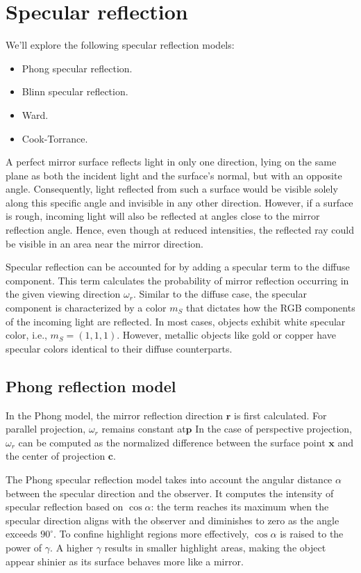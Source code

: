 \section{Specular reflection}

We'll explore the following specular reflection models:
\begin{itemize}
    \item Phong specular reflection.
    \item Blinn specular reflection.
    \item Ward.
    \item Cook-Torrance.
\end{itemize}
A perfect mirror surface reflects light in only one direction, lying on the same plane as both the incident light and the surface's normal, but with an opposite angle. 
Consequently, light reflected from such a surface would be visible solely along this specific angle and invisible in any other direction. 
However, if a surface is rough, incoming light will also be reflected at angles close to the mirror reflection angle. 
Hence, even though at reduced intensities, the reflected ray could be visible in an area near the mirror direction.

Specular reflection can be accounted for by adding a specular term to the diffuse component. 
This term calculates the probability of mirror reflection occurring in the given viewing direction $\omega_r$.
Similar to the diffuse case, the specular component is characterized by a color $m_S$ that dictates how the RGB components of the incoming light are reflected.
In most cases, objects exhibit white specular color, i.e., $m_S = (1,1,1)$.
However, metallic objects like gold or copper have specular colors identical to their diffuse counterparts.

\subsection{Phong reflection model}
In the Phong model, the mirror reflection direction $\mathbf{r}$  is first calculated.
For parallel projection, $\omega_r$ remains constant at$\mathbf{p}$
In the case of perspective projection, $\omega_r$ can be computed as the normalized difference between the surface point $\mathbf{x}$ and the center of projection $\mathbf{c}$. 

The Phong specular reflection model takes into account the angular distance $\alpha$ between the specular direction and the observer. 
It computes the intensity of specular reflection based on $\cos\alpha$: the term reaches its maximum when the specular direction aligns with the observer and diminishes to zero as the angle exceeds $90^\circ$. 
To confine highlight regions more effectively, $\cos\alpha$ is raised to the power of $\gamma$.
A higher $\gamma$ results in smaller highlight areas, making the object appear shinier as its surface behaves more like a mirror.

